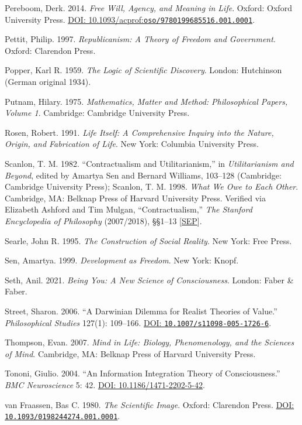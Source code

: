 \documentclass[
  english,
  11pt,
  oneside]{book}
\begin{document}
Pereboom, Derk. 2014. \emph{Free Will, Agency, and Meaning in Life}. Oxford: Oxford University Press. \href{https://doi.org/10.1093/acprof:oso/9780199685516.001.0001}{DOI: 10.1093/acprof:\nolinkurl{oso/9780199685516.001.0001}}.

Pettit, Philip. 1997. \emph{Republicanism: A Theory of Freedom and Government}. Oxford: Clarendon Press.

Popper, Karl R. 1959. \emph{The Logic of Scientific Discovery}. London: Hutchinson (German original 1934).

Putnam, Hilary. 1975. \emph{Mathematics, Matter and Method: Philosophical Papers, Volume 1}. Cambridge: Cambridge University Press.

Rosen, Robert. 1991. \emph{Life Itself: A Comprehensive Inquiry into the Nature, Origin, and Fabrication of Life}. New York: Columbia University Press.

Scanlon, T. M. 1982. ``Contractualism and Utilitarianism,'' in \emph{Utilitarianism and Beyond}, edited by Amartya Sen and Bernard Williams, 103--128 (Cambridge: Cambridge University Press); Scanlon, T. M. 1998. \emph{What We Owe to Each Other}. Cambridge, MA: Belknap Press of Harvard University Press. Verified via Elizabeth Ashford and Tim Mulgan, ``Contractualism,'' \emph{The Stanford Encyclopedia of Philosophy} (2007/2018), §§1--13 {[}\href{https://plato.stanford.edu/entries/contractualism/}{SEP}{]}.

Searle, John R. 1995. \emph{The Construction of Social Reality}. New York: Free Press.

Sen, Amartya. 1999. \emph{Development as Freedom}. New York: Knopf.

Seth, Anil. 2021. \emph{Being You: A New Science of Consciousness}. London: Faber \& Faber.

Street, Sharon. 2006. ``A Darwinian Dilemma for Realist Theories of Value.'' \emph{Philosophical Studies} 127(1): 109--166. \href{https://doi.org/10.1007/s11098-005-1726-6}{DOI: \nolinkurl{10.1007/s11098-005-1726-6}}.

Thompson, Evan. 2007. \emph{Mind in Life: Biology, Phenomenology, and the Sciences of Mind}. Cambridge, MA: Belknap Press of Harvard University Press.

Tononi, Giulio. 2004. ``An Information Integration Theory of Consciousness.'' \emph{BMC Neuroscience} 5: 42. \href{https://doi.org/10.1186/1471-2202-5-42}{DOI: 10.1186/1471-2202-5-42}.

van Fraassen, Bas C. 1980. \emph{The Scientific Image}. Oxford: Clarendon Press. \href{https://doi.org/10.1093/0198244274.001.0001}{DOI: \nolinkurl{10.1093/0198244274.001.0001}}.
\end{document}
